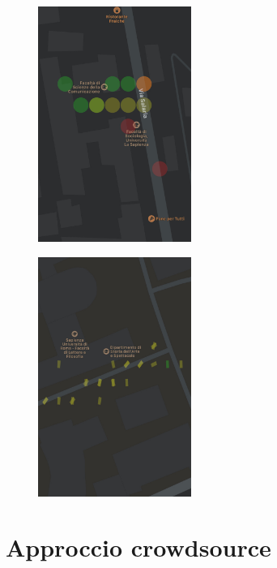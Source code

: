 \begin{figure}
    \centering
    \begin{minipage}{.4\textwidth}
        \centering
        \includegraphics[width=5cm]{images/circle_overlays.png}
        \label{fig:circle_overlays}
    \end{minipage}
    \begin{minipage}{.4\textwidth}
        \centering
        \includegraphics[width=5cm]{images/polygon_overlays.png}
        \label{fig:polygon_overlays}
    \end{minipage}
\end{figure}


\section{Approccio crowdsource}

